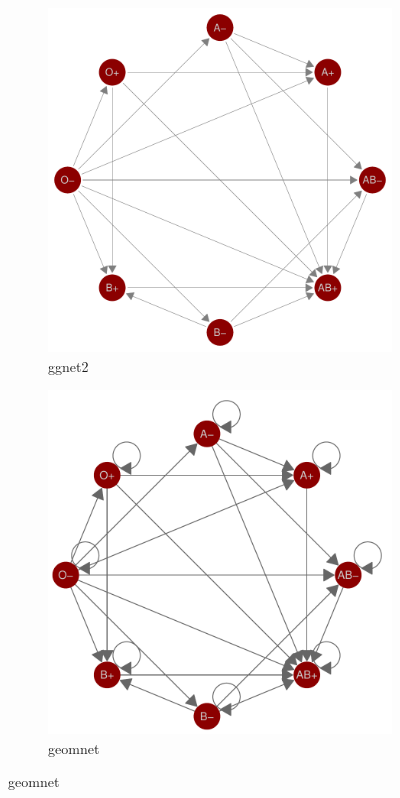 \begin{figure}[hbt]
\begin{subfigure}[t]{.32\textwidth}
\caption{ggnet2}
\includegraphics[width=\textwidth]{figure/blood_ggnet2-1.pdf}
\end{subfigure}
\begin{subfigure}[t]{.32\textwidth}
\caption{geomnet}
\includegraphics[width=\textwidth]{figure/blood_geom_net-1.pdf}

\end{subfigure}
\end{figure}

